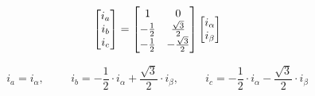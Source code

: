 \begin{equation}
    \centering
    \begin{bmatrix}
        i_{a} \\ 
        i_{b} \\ 
        i_{c}
    \end{bmatrix}
    =
    \begin{bmatrix}
        1 & 0 \\
        - \frac{1}{2} & \frac{\sqrt{3}}{2} \\
        - \frac{1}{2} & - \frac{\sqrt{3}}{2}
    \end{bmatrix}
    \begin{bmatrix}
        i_{\alpha} \\ 
        i_{\beta}
    \end{bmatrix}
\end{equation}


\begin{equation}
    i_{a} = i_{\alpha}
    , \hspace{1cm}
    i_{b} = -\frac{1}{2} \cdot i_{\alpha} + \frac{\sqrt{3}}{2} \cdot i_{\beta}
    , \hspace{1cm}
    i_{c} = -\frac{1}{2} \cdot i_{\alpha} - \frac{\sqrt{3}}{2} \cdot i_{\beta}
    \label{eq:inverse_clarke_transformation}
\end{equation}